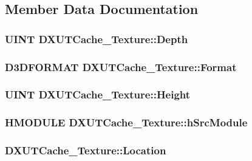 \subsection{Member Data Documentation}
\hypertarget{struct_d_x_u_t_cache___texture_a0ee63f98691312bf1da4d84196192a4c}{
\subsubsection[{Depth}]{\setlength{\rightskip}{0pt plus 5cm}UINT {\bf DXUTCache\_\-Texture::Depth}}}
\label{struct_d_x_u_t_cache___texture_a0ee63f98691312bf1da4d84196192a4c}
\hypertarget{struct_d_x_u_t_cache___texture_a999124a25f441a76c5c9df9ffa8ebd3f}{
\subsubsection[{Format}]{\setlength{\rightskip}{0pt plus 5cm}D3DFORMAT {\bf DXUTCache\_\-Texture::Format}}}
\label{struct_d_x_u_t_cache___texture_a999124a25f441a76c5c9df9ffa8ebd3f}
\hypertarget{struct_d_x_u_t_cache___texture_a83b1f09e46adc2179ce422afe4221554}{
\subsubsection[{Height}]{\setlength{\rightskip}{0pt plus 5cm}UINT {\bf DXUTCache\_\-Texture::Height}}}
\label{struct_d_x_u_t_cache___texture_a83b1f09e46adc2179ce422afe4221554}
\hypertarget{struct_d_x_u_t_cache___texture_a07369d4ea106a4a0780c81e8e6c4d7be}{
\subsubsection[{hSrcModule}]{\setlength{\rightskip}{0pt plus 5cm}HMODULE {\bf DXUTCache\_\-Texture::hSrcModule}}}
\label{struct_d_x_u_t_cache___texture_a07369d4ea106a4a0780c81e8e6c4d7be}
\hypertarget{struct_d_x_u_t_cache___texture_a6c3eaa5b8daece02e1d6dd7d25c5b07b}{
\subsubsection[{Location}]{ {\bf DXUTCache\_\-Texture::Location}}}
